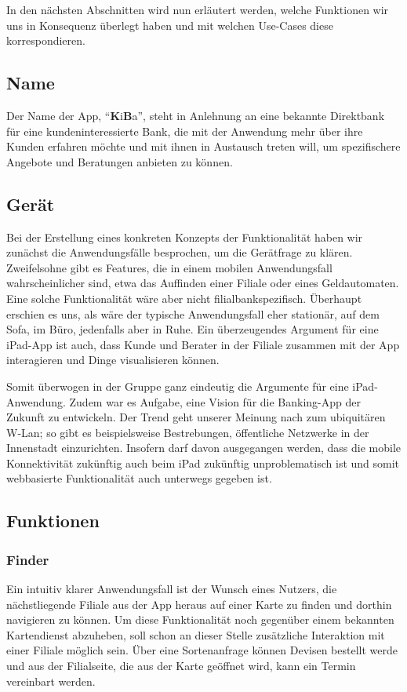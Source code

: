 In den nächsten Abschnitten wird nun erläutert werden, welche Funktionen wir uns in Konsequenz überlegt haben und mit welchen Use-Cases diese korrespondieren.

\subsection{Name}
    Der Name der App, "`\textbf{K}i\textbf{B}a"', steht in Anlehnung an eine bekannte Direktbank für eine kundeninteressierte Bank, die mit der Anwendung mehr über ihre Kunden erfahren möchte und mit ihnen in Austausch treten will, um spezifischere Angebote und Beratungen anbieten zu können.
    
\subsection{Gerät}
    Bei der Erstellung eines konkreten Konzepts der Funktionalität haben wir zunächst die Anwendungsfälle besprochen, um die Gerätfrage zu klären. Zweifelsohne gibt es Features, die in einem mobilen Anwendungsfall wahrscheinlicher sind, etwa das Auffinden einer Filiale oder eines Geldautomaten. Eine solche Funktionalität wäre aber nicht filialbankspezifisch. Überhaupt erschien es uns, als wäre der typische Anwendungsfall eher stationär, auf dem Sofa, im Büro, jedenfalls aber in Ruhe. Ein überzeugendes Argument für eine iPad-App ist auch, dass Kunde und Berater in der Filiale zusammen mit der App interagieren und Dinge visualisieren können.     
    
    Somit überwogen in der Gruppe ganz eindeutig die Argumente für eine iPad-Anwendung. Zudem war es Aufgabe, eine Vision für die Banking-App der Zukunft zu entwickeln. Der Trend geht unserer Meinung nach zum ubiquitären W-Lan; so gibt es beispielsweise Bestrebungen, öffentliche Netzwerke in der Innenstadt einzurichten. Insofern darf davon ausgegangen werden, dass die mobile Konnektivität zukünftig auch beim iPad zukünftig unproblematisch ist und somit webbasierte Funktionalität auch unterwegs gegeben ist.
    
\subsection{Funktionen}

\subsubsection{Finder}
Ein intuitiv klarer Anwendungsfall ist der Wunsch eines Nutzers, die nächstliegende Filiale aus der App heraus auf einer Karte zu finden und dorthin navigieren zu können. Um diese Funktionalität noch gegenüber einem bekannten Kartendienst abzuheben, soll schon an dieser Stelle zusätzliche Interaktion mit einer Filiale möglich sein. Über eine Sortenanfrage können Devisen bestellt werde und aus der Filialseite, die aus der Karte geöffnet wird, kann ein Termin vereinbart werden.

